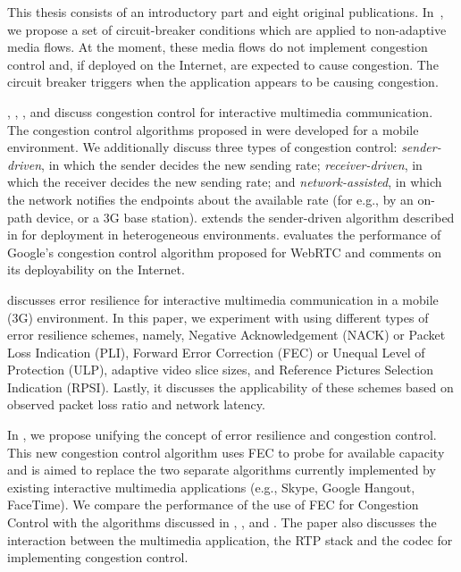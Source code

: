 This thesis consists of an introductory part and eight original publications.
In~, we propose a set of circuit-breaker conditions which are
applied to non-adaptive media flows. At the moment, these media flows do not
implement congestion control and, if deployed on the Internet, are expected to
cause congestion. The circuit breaker triggers when the application appears to
be causing congestion.

, , , and 
discuss congestion control for interactive multimedia communication. The
congestion control algorithms proposed in  were developed for
a mobile environment. We additionally discuss three types of congestion
control:  \emph{sender-driven}, in which the sender decides the new sending rate;
\emph{receiver-driven}, in which the receiver decides the new sending rate; and
\emph{network-assisted}, in which the network notifies the endpoints about the available
rate (for e.g., by an on-path device, or a 3G base station). 
extends the sender-driven algorithm described in  for
deployment in heterogeneous environments.  evaluates the
performance of Google's congestion control algorithm proposed for WebRTC and
comments on its deployability on the Internet.

 discusses error resilience for interactive multimedia
communication in a mobile (3G) environment. In this paper, we experiment with
using different types of error resilience schemes, namely, Negative
Acknowledgement (NACK) or Packet Loss Indication (PLI), Forward Error
Correction (FEC) or Unequal Level of Protection (ULP), adaptive video slice
sizes, and Reference Pictures Selection Indication (RPSI). Lastly, it
discusses the applicability of these schemes based on observed packet loss
ratio and network latency.

In , we propose unifying the concept of error resilience and
congestion control. This new congestion control algorithm uses FEC to probe
for available capacity and is aimed to replace the two separate algorithms currently
implemented by existing interactive multimedia applications (e.g., Skype,
Google Hangout, FaceTime). We compare the performance of the use of FEC for
Congestion Control with the algorithms discussed in ,
, and . The paper also discusses the
interaction between the multimedia application, the RTP stack and the codec
for implementing congestion control.


